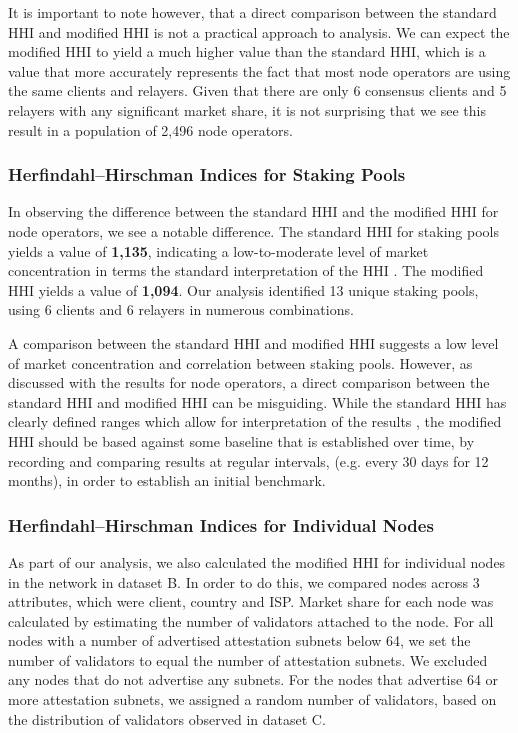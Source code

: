 \documentclass[conference]{IEEEtran}
\begin{document}
It is important to note however, that a direct comparison between the standard HHI and modified HHI is not a practical approach to analysis. We can expect the modified HHI to yield a much higher value than the standard HHI, which is a value that more accurately represents the fact that most node operators are using the same clients and relayers.  Given that there are only 6 consensus clients and 5 relayers with any significant market share, it is not surprising that we see this result in a population of 2,496 node operators. 

\subsubsection{Herfindahl–Hirschman Indices for Staking Pools}

In observing the difference between the standard HHI and the modified HHI for node operators, we see a notable difference.  The standard HHI for staking pools yields a value of \textbf{1,135}, indicating a low-to-moderate level of market concentration in terms the standard interpretation of the HHI \cite{usdoj2015}.  The modified HHI yields a value of \textbf{1,094}.  Our analysis identified 13 unique staking pools, using 6 clients and 6 relayers in numerous combinations.

A comparison between the standard HHI and modified HHI suggests a low level of market concentration and correlation between staking pools.  However, as discussed with the results for node operators, a direct comparison between the standard HHI and modified HHI can be misguiding.  While the standard HHI has clearly defined ranges which allow for interpretation of the results \cite{usdoj2015}, the modified HHI should be based against some baseline that is established over time, by recording and comparing results at regular intervals, (e.g. every 30 days for 12 months), in order to establish an initial benchmark.

\subsubsection{Herfindahl–Hirschman Indices for Individual Nodes}

As part of our analysis, we also calculated the modified HHI for individual nodes in the network in dataset B.  In order to do this, we compared nodes across 3 attributes, which were client, country and ISP.  Market share for each node was calculated by estimating the number of validators attached to the node.  For all nodes with a number of advertised attestation subnets below 64, we set the number of validators to equal the number of attestation subnets.  We excluded any nodes that do not advertise any subnets.  For the nodes that advertise 64 or more attestation subnets, we assigned a random number of validators, based on the distribution of validators observed in dataset C.
\end{document}
